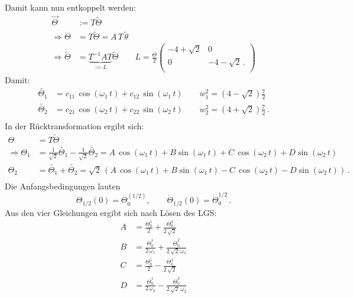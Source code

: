 Damit kann nun entkoppelt werden:\\
\begin{equation*}
	\begin{split}
		\vec{\Theta} &:= T \tilde{\Theta} \\
		\Rightarrow \ddot{\Theta} &= T \ddot{\tilde{\Theta}} = A\,T\,\tilde{\theta} \\
		\Rightarrow \ddot{\tilde{\Theta}} &= \underbrace{T^{-1} A T}_{:=L} \tilde{\Theta} \qquad L =\frac{\Theta}{2}
		\begin{pmatrix}
			-4+\sqrt{2} & 0 \\
			0 & -4-\sqrt{2} \,. \\		
		\end{pmatrix}
	\end{split}
\end{equation*}
Damit:
\begin{equation*}
	\begin{split}
		\tilde{\Theta_1} &= c_{11}\,\cos(\omega_1\,t)+c_{12}\,\sin(\omega_1\,t) \qquad w_1^2 = (4-\sqrt{2})\frac{7}{2} \\
		\tilde{\Theta_2} &= c_{21}\,\cos(\omega_2\,t)+c_{22}\,\sin(\omega_2\,t) \qquad w_2^2 = (4+\sqrt{2})\frac{7}{2} \, . \\
	\end{split}
\end{equation*}
In der Rücktransformation ergibt sich:
\begin{equation*}
	\begin{split}
		\Theta &= T \tilde{\Theta} \\
		\Rightarrow \Theta_1 &= \frac{1}{\sqrt{2}} \tilde{\Theta_1} - \frac{1}{\sqrt{2}} \tilde{\Theta_2} = A\,\cos(\omega_1\,t)+B\sin(\omega_1\,t)+C\,\cos(\omega_2\,t)+D\sin(\omega_2\,t) \\
		\Theta_2 &= \tilde{\Theta_1} + \tilde{\Theta_2} = \sqrt{2}\,\left(A\,\cos(\omega_1\,t)+B\sin(\omega_1\,t)-C\,\cos(\omega_2\,t)-D\sin(\omega_2\,t)\right)\,.\\
	\end{split}
\end{equation*}
Die Anfangsbedingungen lauten
\begin{equation*}
	\Theta_{1/2}(0) = \Theta_0^{(1/2)}, \qquad \dot{\Theta}_{1/2}(0) = \dot{\Theta}^{1/2}_0 \,.
\end{equation*}
Aus den vier Gleichungen ergibt sich nach Lösen des LGS:
\begin{equation*}
	\begin{split}
		A &= \frac{\Theta_0^1}{2} + \frac{\Theta_0^2}{2\,\sqrt{2}} \\
		B &= \frac{\dot{\Theta}_0^1}{2\,\omega_1} + \frac{\dot{\Theta}_0^2}{2\,\sqrt{2}\,\omega_1} \\
		C &= \frac{\Theta_0^1}{2} - \frac{\Theta_0^2}{2\,\sqrt{2}} \\
		D &= \frac{\dot{\Theta}_0^1}{2\,\omega_2} - \frac{\dot{\Theta}_0^2}{2\,\sqrt{2}\,\omega_2} \\
	\end{split}
\end{equation*}
